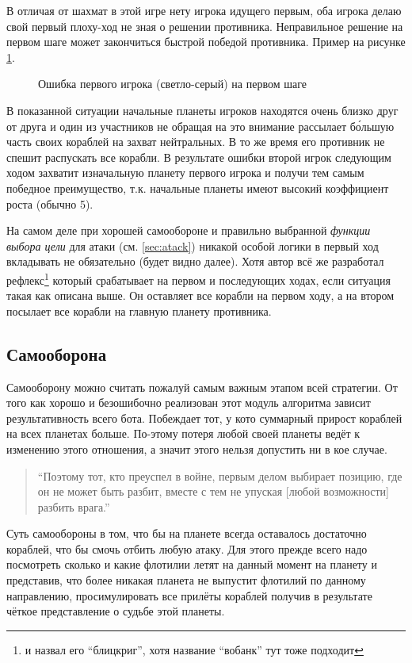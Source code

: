 \documentclass[12pt]{report}
\begin{document}
В отличая от шахмат в этой игре нету игрока идущего первым, оба игрока делаю свой первый плоху-ход не зная о решении противника. Неправильное решение на первом шаге может закончиться быстрой победой противника. Пример на рисунке \ref{fig:first_move1}.

\begin{figure}[h]
	\centering
	
	\caption{Ошибка первого игрока (светло-серый) на первом шаге}
	\label{fig:first_move1}
\end{figure}
В показанной ситуации начальные планеты игроков находятся очень близко друг от друга и один из участников не обращая на это внимание рассылает б\'{о}льшую часть своих кораблей на захват нейтральных. В то же время его противник не спешит распускать все корабли. В результате ошибки второй игрок следующим ходом захватит изначальную планету первого игрока и получи тем самым победное преимущество, т.к. начальные планеты имеют высокий коэффициент роста (обычно 5).

На самом деле при хорошей самообороне и правильно выбранной \emph{функции выбора цели} для атаки (см. \ref{sec:atack}) никакой особой логики в первый ход вкладывать не обязательно (будет видно далее). Хотя автор всё же разработал рефлекс\footnote{и назвал его ``блицкриг'', хотя название ``вобанк'' тут тоже подходит} который срабатывает на первом и последующих ходах, если ситуация такая как описана выше. Он оставляет все корабли на первом ходу, а на втором посылает все корабли на главную планету противника.

\subsection{Самооборона}
\label{sec:selfdefense}
Самооборону можно считать пожалуй самым важным этапом всей стратегии. От того как хорошо и безошибочно реализован этот модуль алгоритма зависит результативность всего бота. Побеждает тот, у кото суммарный прирост кораблей на всех планетах больше. По-этому потеря любой своей планеты ведёт к изменению этого отношения, а значит этого нельзя допустить ни в кое случае.
\begin{quote}
``Поэтому тот, кто преуспел в войне, первым делом выбирает позицию, где он не может быть разбит, вместе с тем не упуская [любой возможности] разбить врага.'' \\
\citep{tzu1971art}
\end{quote}

Суть самообороны в том, что бы на планете всегда оставалось достаточно кораблей, что бы смочь отбить любую атаку. Для этого прежде всего надо посмотреть сколько и какие флотилии летят на данный момент на планету и представив, что более никакая планета не выпустит флотилий по данному направлению, просимулировать все прилёты кораблей получив в результате чёткое представление о судьбе этой планеты. 
\end{document}
